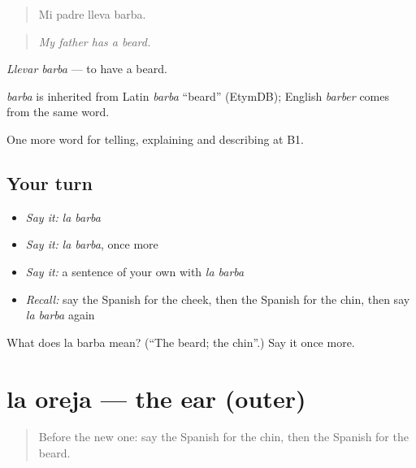 \begin{quote}
Mi padre lleva barba.
\end{quote}

\begin{quote}
\emph{My father has a beard.}
\end{quote}

\emph{Llevar barba} — to have a beard.

\begin{cousinweb}
\emph{barba} is inherited from Latin \emph{barba} \textquotedblleft{}beard\textquotedblright{} (EtymDB); English \emph{barber} comes from the same word.
\end{cousinweb}

\begin{grammarlens}[title={What you've built}]
One more word for telling, explaining and describing at B1.
\end{grammarlens}

\subsection*{Your turn}
\begin{itemize}
\raggedright
  \item \emph{Say it:} \emph{la barba}
  \item \emph{Say it:} \emph{la barba}, once more
  \item \emph{Say it:} a sentence of your own with \emph{la barba}
  \item \emph{Recall:} say the Spanish for the cheek, then the Spanish for the chin, then say \emph{la barba} again
\end{itemize}

\begin{tcolorbox}[breakable,colback=teal!4,colframe=teal!35!black,title={Before you move on}]
What does la barba mean? (\textquotedblleft{}The beard; the chin\textquotedblright{}.) Say it once more.
\end{tcolorbox}
\section[la oreja]{la oreja — the ear (outer)}

\label{lesson:ES-C736-oreja}



\begin{quote}
Before the new one: say the Spanish for the chin, then the Spanish for the beard.
\end{quote}


